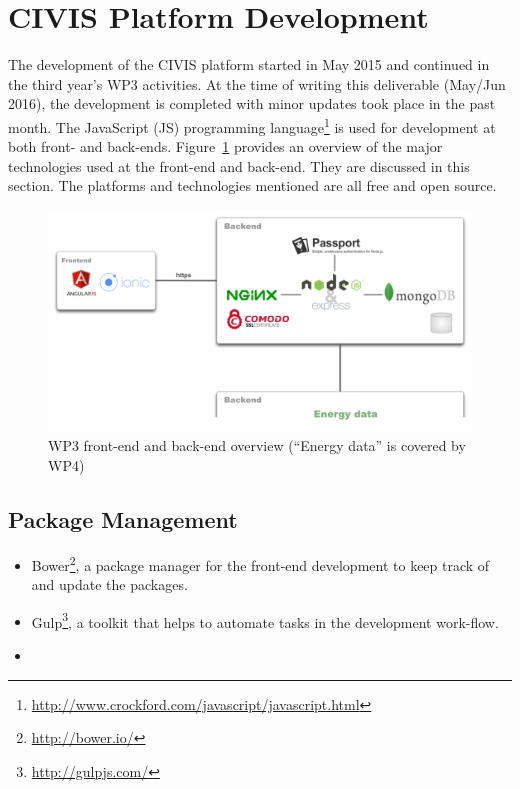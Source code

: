 \section{CIVIS Platform  Development} 
 
The development of the CIVIS platform started in May 2015 \citep{Huang2015c} and continued in the third year's WP3 activities. At the time of writing this deliverable (May/Jun 2016), the development is completed with minor updates took place in the past month.
% 
The JavaScript (JS) programming language\footnote{\url{http://www.crockford.com/javascript/javascript.html}} is used for development at both front- and back-ends. 
Figure~\ref{fig:ScreenShot2015-11-09at18} provides an overview of the major technologies used at the front-end and back-end. They are discussed in this section. 
The platforms and technologies mentioned are all free and open source. 

\begin{figure}
\centering
\includegraphics[width=0.9\linewidth]{img/tech}
\caption{WP3 front-end and back-end overview (``Energy data'' is covered by WP4)}
\label{fig:ScreenShot2015-11-09at18}
\end{figure}





\subsection{Package Management}

\begin{itemize}

\item Bower\footnote{\url{http://bower.io/}}, a package manager for the front-end development to keep track of and update the packages. 

\item Gulp\footnote{\url{http://gulpjs.com/}}, a toolkit that helps to automate tasks in the development work-flow. 

\item 

\end{itemize}